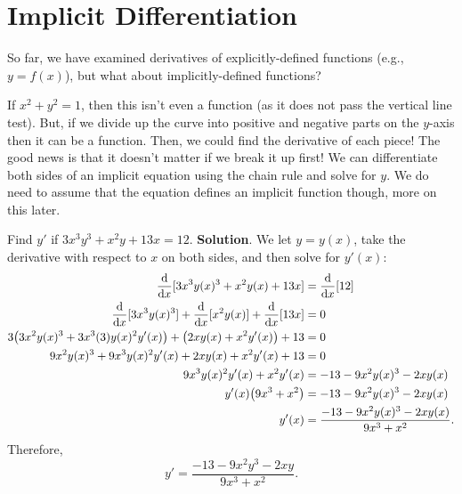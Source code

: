 \section{Implicit Differentiation}
So far, we have examined derivatives of explicitly-defined functions (e.g., $ y=f(x) $), but what about implicitly-defined functions?
\begin{Example}{}{}
    If $ x^2+y^2=1 $, then this isn't even a function (as it does not pass the vertical line test). But, if we divide
    up the curve into positive and negative parts on the $ y $-axis then it can be a function. Then,
    we could find the derivative of each piece! The good news is that it doesn't matter if we break it up first!
    We can differentiate both sides of an implicit equation using the chain rule and solve for $ y $. We do need to assume
    that the equation defines an implicit function though, more on this later.
\end{Example}
\begin{Example}{}{}
    Find $ y' $ if $ 3x^3 y^3+x^2 y+13x=12 $.
    \tcblower{}
    \textbf{Solution}. We let $ y=y(x) $, take the derivative with respect to $ x $ on both sides, and then solve for $ y'(x) $:
    \begin{align*}
        \odv*{[3x^3 y(x)^3+x^2 y(x)+13x]}{x}                                           & =\odv*{[12]}{x}                               \\
        \odv*{[3x^3 y(x)^3]}{x}+\odv*{[x^2 y(x)]}{x}+\odv*{[13x]}{x}                   & =0                                            \\
        3\bigl( 3x^2y(x)^3+3x^3(3)y(x)^2 y'(x) \bigr) +\bigl(2xy(x)+x^2 y'(x)\bigr)+13 & =0                                            \\
        9 x^2 y(x)^3 + 9 x^3 y(x)^2 y'(x) + 2 x y(x)+ x^2 y'(x) + 13                   & =0                                            \\
        9 x^3 y(x)^2 y'(x)+x^2 y'(x)                                                   & =-13-9 x^2 y(x)^3-2 x y(x)                    \\
        y'(x)\bigl( 9 x^3+x^2\bigr)                                                    & =-13-9 x^2 y(x)^3-2 x y(x)                    \\
        y'(x)                                                                          & =\frac{-13-9 x^2 y(x)^3-2 x y(x)}{9 x^3+x^2}.
    \end{align*}
    Therefore,
    \[ y'=\frac{-13-9 x^2 y^3-2 x y}{9 x^3+x^2}. \]
\end{Example}

